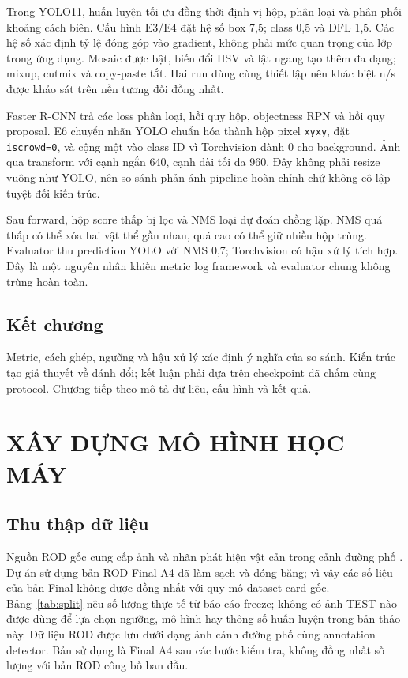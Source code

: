 \documentclass[12pt,a4paper,oneside]{report}
\begin{document}
Trong YOLO11, huấn luyện tối ưu đồng thời định vị hộp, phân loại và phân phối khoảng cách biên. Cấu hình E3/E4 đặt hệ số box 7,5; class 0,5 và DFL 1,5. Các hệ số xác định tỷ lệ đóng góp vào gradient, không phải mức quan trọng của lớp trong ứng dụng. Mosaic được bật, biến đổi HSV và lật ngang tạo thêm đa dạng; mixup, cutmix và copy-paste tắt. Hai run dùng cùng thiết lập nên khác biệt n/s được khảo sát trên nền tương đối đồng nhất.

Faster R-CNN trả các loss phân loại, hồi quy hộp, objectness RPN và hồi quy proposal. E6 chuyển nhãn YOLO chuẩn hóa thành hộp pixel \texttt{xyxy}, đặt \texttt{iscrowd=0}, và cộng một vào class ID vì Torchvision dành 0 cho background. Ảnh qua transform với cạnh ngắn 640, cạnh dài tối đa 960. Đây không phải resize vuông như YOLO, nên so sánh phản ánh pipeline hoàn chỉnh chứ không cô lập tuyệt đối kiến trúc.

Sau forward, hộp score thấp bị lọc và NMS loại dự đoán chồng lặp. NMS quá thấp có thể xóa hai vật thể gần nhau, quá cao có thể giữ nhiều hộp trùng. Evaluator thu prediction YOLO với NMS 0,7; Torchvision có hậu xử lý tích hợp. Đây là một nguyên nhân khiến metric log framework và evaluator chung không trùng hoàn toàn.
\section{Kết chương}
Metric, cách ghép, ngưỡng và hậu xử lý xác định ý nghĩa của so sánh. Kiến trúc tạo giả thuyết về đánh đổi; kết luận phải dựa trên checkpoint đã chấm cùng protocol. Chương tiếp theo mô tả dữ liệu, cấu hình và kết quả.
\chapter{XÂY DỰNG MÔ HÌNH HỌC MÁY}\label{chap:data}
\section{Thu thập dữ liệu}
Nguồn ROD gốc cung cấp ảnh và nhãn phát hiện vật cản trong cảnh đường phố \cite{rod}. Dự án sử dụng bản ROD Final A4 đã làm sạch và đóng băng; vì vậy các số liệu của bản Final không được đồng nhất với quy mô dataset card gốc.   Bảng~\ref{tab:split} nêu số lượng thực tế từ báo cáo freeze; không có ảnh TEST nào được dùng để lựa chọn ngưỡng, mô hình hay thông số huấn luyện trong bản thảo này.
Dữ liệu ROD được lưu dưới dạng ảnh cảnh đường phố cùng annotation detector. Bản sử dụng là Final A4 sau các bước kiểm tra, không đồng nhất số lượng với bản ROD công bố ban đầu.
\end{document}
